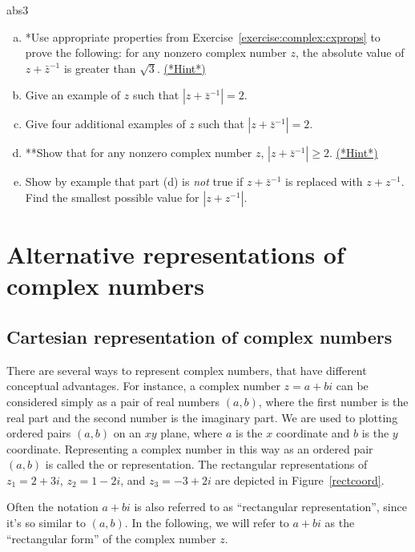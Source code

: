 \begin{exercise}{abs3}
\begin{enumerate}[(a)]
\item *Use appropriate properties from Exercise~\ref{exercise:complex:cxprops} to prove the following: for any nonzero complex number $z$, the absolute value of $z + \bar{z}^{-1}$ is greater than $\sqrt{3}$. 
\hyperref[sec:complex:hints]{(*Hint*)}

\item Give an example of $z$ such that $|z + \bar{z}^{-1}| = 2$. 
\item Give four additional examples of $z$ such that $|z + \bar{z}^{-1}| = 2$. 
\item **Show that for any nonzero complex number $z$, $|z + \bar{z}^{-1}| \ge 2$. 
\hyperref[sec:complex:hints]{(*Hint*)}
\item Show by example that part (d) is \emph{not} true if $z + \bar{z}^{-1}$ is replaced with $z + z^{-1}$.  Find the smallest possible 
value for $|z + z^{-1}|$.
\end{enumerate}
\end{exercise}


\section{Alternative representations of complex numbers\quad
{}}\label{complex_graphical}
\subsection{Cartesian representation of complex numbers}
There are several ways to represent complex numbers, that have different conceptual advantages.
For instance, a complex number $z=a+bi$ can be considered simply as a pair of real numbers $(a,b)$, where the first number is the real part and the second number is the imaginary part. We are used to plotting ordered pairs $(a,b)$  on an $xy$ plane, where $a$ is the $x$ coordinate and $b$
is the $y$ coordinate. Representing a complex number in this way as an ordered pair $(a,b)$  is called the 
 or  representation. The rectangular
representations of $z_{1}=2+3i$, $z_{2}=1-2i$, and $z_{3}=-3+2i$
are depicted in Figure~\ref{rectcoord}.

Often the notation $a + bi$ is also referred to as ``rectangular representation'', since it's so similar to $(a,b)$. In the following, we will refer to $a + bi$ as the ``rectangular form'' of the complex number $z$.

